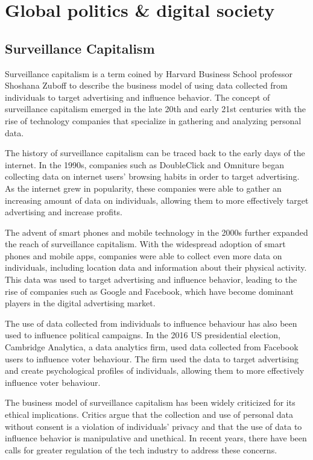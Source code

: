 \section{Global politics \& digital society}
\subsection{Surveillance Capitalism}
Surveillance capitalism is a term coined by Harvard Business School professor Shoshana Zuboff to describe the business model of using data collected from individuals to target advertising and influence behavior. The concept of surveillance capitalism emerged in the late 20th and early 21st centuries with the rise of technology companies that specialize in gathering and analyzing personal data.\par
The history of surveillance capitalism can be traced back to the early days of the internet. In the 1990s, companies such as DoubleClick and Omniture began collecting data on internet users' browsing habits in order to target advertising. As the internet grew in popularity, these companies were able to gather an increasing amount of data on individuals, allowing them to more effectively target advertising and increase profits.\par
The advent of smart phones and mobile technology in the 2000s further expanded the reach of surveillance capitalism. With the widespread adoption of smart phones and mobile apps, companies were able to collect even more data on individuals, including location data and information about their physical activity. This data was used to target advertising and influence behavior, leading to the rise of companies such as Google and Facebook, which have become dominant players in the digital advertising market.\par
The use of data collected from individuals to influence behaviour has also been used to influence political campaigns. In the 2016 US presidential election, Cambridge Analytica, a data analytics firm, used data collected from Facebook users to influence voter behaviour. The firm used the data to target advertising and create psychological profiles of individuals, allowing them to more effectively influence voter behaviour.\par
The business model of surveillance capitalism has been widely criticized for its ethical implications. Critics argue that the collection and use of personal data without consent is a violation of individuals' privacy and that the use of data to influence behavior is manipulative and unethical. In recent years, there have been calls for greater regulation of the tech industry to address these concerns.\par 
